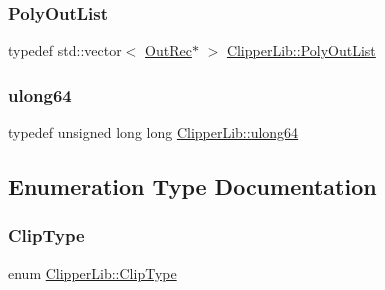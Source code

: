 \mbox{\label{namespace_clipper_lib_a955330d96f532e139adb1e52a82fcd43}} 
\subsubsection{\texorpdfstring{PolyOutList}{PolyOutList}}
{\footnotesize\ttfamily typedef std\+::vector$<$ \mbox{\hyperlink{struct_clipper_lib_1_1_out_rec}{Out\+Rec}}$\ast$ $>$ \mbox{\hyperlink{namespace_clipper_lib_a955330d96f532e139adb1e52a82fcd43}{Clipper\+Lib\+::\+Poly\+Out\+List}}}

\mbox{\label{namespace_clipper_lib_a031fec5e97eb7e08708f1cafa53a232d}} 
\subsubsection{\texorpdfstring{ulong64}{ulong64}}
{\footnotesize\ttfamily typedef unsigned long long \mbox{\hyperlink{namespace_clipper_lib_a031fec5e97eb7e08708f1cafa53a232d}{Clipper\+Lib\+::ulong64}}}



\subsection{Enumeration Type Documentation}
\mbox{\label{namespace_clipper_lib_a3db4fddd50b81ba657107505821d7f46}} 
\subsubsection{\texorpdfstring{ClipType}{ClipType}}
{\footnotesize\ttfamily enum \mbox{\hyperlink{namespace_clipper_lib_a3db4fddd50b81ba657107505821d7f46}{Clipper\+Lib\+::\+Clip\+Type}}}

